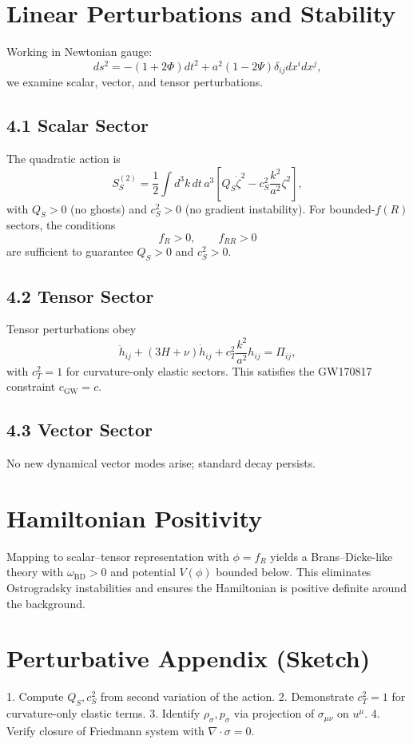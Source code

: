 \documentclass[12pt,a4paper]{article}
\begin{document}
\section{Linear Perturbations and Stability}
Working in Newtonian gauge:
\begin{equation}
ds^2=-(1+2\Phi)dt^2+a^2(1-2\Psi)\delta_{ij}dx^i dx^j,
\end{equation}
we examine scalar, vector, and tensor perturbations.

\subsection*{4.1 Scalar Sector}
The quadratic action is
\begin{equation}
S^{(2)}_S=\frac{1}{2}\int d^3k\,dt\,a^3\!\left[Q_S\dot{\zeta}^2-c_S^2\frac{k^2}{a^2}\zeta^2\right],
\end{equation}
with $Q_S>0$ (no ghosts) and $c_S^2>0$ (no gradient instability).  
For bounded-$f(R)$ sectors, the conditions
\[
f_R>0,\qquad f_{RR}>0
\]
are sufficient to guarantee $Q_S>0$ and $c_S^2>0$.

\subsection*{4.2 Tensor Sector}
Tensor perturbations obey
\begin{equation}
\ddot h_{ij}+(3H+\nu)\dot h_{ij}+c_T^2\frac{k^2}{a^2}h_{ij}=\Pi_{ij},
\end{equation}
with $c_T^2=1$ for curvature-only elastic sectors.  
This satisfies the GW170817 constraint $c_{\mathrm{GW}}=c$.

\subsection*{4.3 Vector Sector}
No new dynamical vector modes arise; standard decay persists.

\section{Hamiltonian Positivity}
Mapping to scalar–tensor representation with $\phi=f_R$ yields a Brans–Dicke-like theory with $\omega_{\mathrm{BD}}>0$ and potential $V(\phi)$ bounded below.  
This eliminates Ostrogradsky instabilities and ensures the Hamiltonian is positive definite around the background.

\section{Perturbative Appendix (Sketch)}
1. Compute $Q_S,c_S^2$ from second variation of the action.  
2. Demonstrate $c_T^2=1$ for curvature-only elastic terms.  
3. Identify $\rho_\sigma,p_\sigma$ via projection of $\sigma_{\mu\nu}$ on $u^\mu$.  
4. Verify closure of Friedmann system with $\nabla\cdot\sigma=0$.
\end{document}
